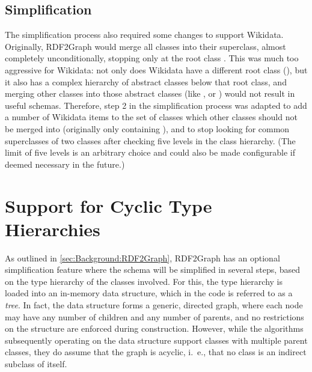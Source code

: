 \subsection{Simplification}
\label{subsec:RDF2Graph+Wikidata:Wikidata:simplification}

The simplification process also required some changes to support \gls{Wikidata}.
Originally, \gls{RDF2Graph} would merge all classes into their superclass,
almost completely unconditionally,
stopping only at the root class .
This was much too aggressive for \gls{Wikidata}:
not only does \gls{Wikidata} have a different root class (),
but it also has a complex hierarchy of abstract classes below that root class,
and merging other classes into those abstract classes
(like ,  or )
would not result in useful \glspl{schema}.
Therefore, step 2 in the simplification process was adapted
to add a number of \gls{Wikidata} \glspl{item} to the set of classes which other classes should not be merged into
(originally only containing ),
and to stop looking for common superclasses of two classes after checking five levels in the class hierarchy.
(The limit of five levels is an arbitrary choice
and could also be made configurable if deemed necessary in the future.) %

\section{Support for Cyclic Type Hierarchies}
\label{sec:RDF2Graph+Wikidata:cyclic-graphs}

As outlined in \cref{sec:Background:RDF2Graph},
\gls{RDF2Graph} has an optional simplification feature
where the \gls{schema} will be simplified in several steps,
based on the type hierarchy of the classes involved.
For this, the type hierarchy is loaded into an in-memory data structure,
which in the code is referred to as a \emph{tree}. %
In fact, the data structure forms a generic, directed graph,
where each node may have any number of children and any number of parents,
and no restrictions on the structure are enforced during construction.
However, while the algorithms subsequently operating on the data structure support classes with multiple parent classes,
they do assume that the graph is acyclic,
i.~e., that no class is an indirect subclass of itself.

